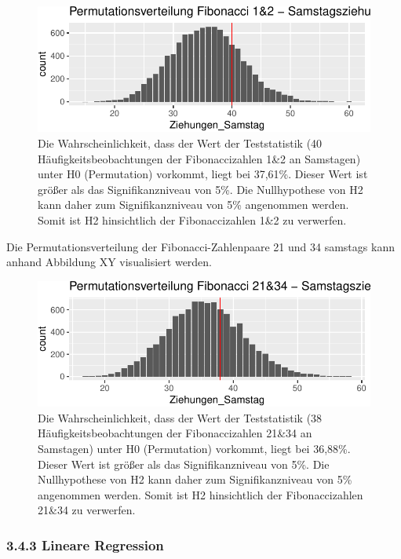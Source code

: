 \documentclass[ngerman,]{article}
\begin{document}
\begin{figure}

\includegraphics{Abbildung/Permut_1_2sa-1} \hfill{}

\caption{Die Wahrscheinlichkeit, dass der Wert der Teststatistik (40 Häufigkeitsbeobachtungen der Fibonaccizahlen 1\&2 an Samstagen) unter H0 (Permutation) vorkommt, liegt bei 37,61\%. Dieser Wert ist größer als das Signifikanzniveau von 5\%. Die Nullhypothese von H2 kann daher zum Signifikanzniveau von 5\% angenommen werden. Somit ist H2 hinsichtlich der Fibonaccizahlen 1\&2 zu verwerfen.}\label{fig:Permut_1_2sa}
\end{figure}

Die Permutationsverteilung der Fibonacci-Zahlenpaare 21 und 34 samstags
kann anhand Abbildung XY visualisiert werden.

\begin{figure}

\includegraphics{Abbildung/Permut_21_34sa-1} \hfill{}

\caption{Die Wahrscheinlichkeit, dass der Wert der Teststatistik (38 Häufigkeitsbeobachtungen der Fibonaccizahlen 21\&34 an Samstagen) unter H0 (Permutation) vorkommt, liegt bei 36,88\%. Dieser Wert ist größer als das Signifikanzniveau von 5\%. Die Nullhypothese von H2 kann daher zum Signifikanzniveau von 5\% angenommen werden. Somit ist H2 hinsichtlich der Fibonaccizahlen 21\&34 zu verwerfen.}\label{fig:Permut_21_34sa}
\end{figure}

\subsubsection{3.4.3 Lineare Regression}\label{lineare-regression}
\end{document}
